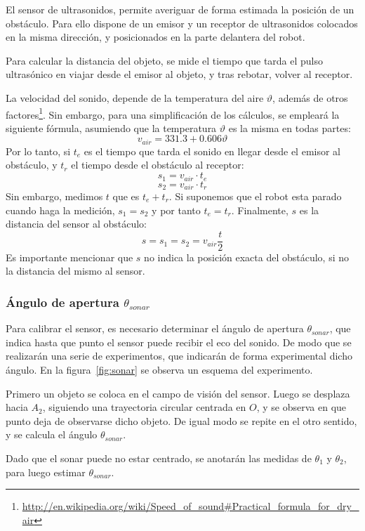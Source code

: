 \documentclass[10pt,a4paper,hidelinks]{article}
\begin{document}
\begin{multicols}{2}
El sensor de ultrasonidos, permite averiguar de forma estimada la posición de un obstáculo. Para ello dispone de un emisor y un receptor de ultrasonidos colocados en la misma dirección, y posicionados en la parte delantera del robot.

Para calcular la distancia del objeto, se mide el tiempo que tarda el pulso ultrasónico en viajar desde el emisor al objeto, y tras rebotar, volver al receptor.

La velocidad del sonido, depende de la temperatura del aire $\vartheta$, además
de otros
factores\footnote{\url{http://en.wikipedia.org/wiki/Speed\_of\_sound\#Practical\_formula\_for\_dry\_air}}.
Sin embargo, para una simplificación de los cálculos, se empleará la siguiente
fórmula, asumiendo que la temperatura $\vartheta$ es la misma en todas partes:
$$ v_{air} = 331.3 + 0.606\vartheta $$
Por lo tanto, si $t_e$ es el tiempo que tarda el sonido en llegar desde el emisor al obstáculo, y $t_r$ el tiempo desde el obstáculo al receptor:
$$ s_1 = v_{air} \cdot t_e $$
$$ s_2 = v_{air} \cdot t_r $$
Sin embargo, medimos $t$ que es $t_e+t_r$. Si suponemos que el robot esta parado cuando haga la medición, $s_1 = s_2$ y por tanto $t_e = t_r$. Finalmente, $s$ es la distancia del sensor al obstáculo:
$$ s = s_1 = s_2 = v_{air}\frac{t}{2} $$
Es importante mencionar que $s$ no indica la posición exacta del obstáculo, si 
no la distancia del mismo al sensor.

\subsubsection{Ángulo de apertura $\theta_{sonar}$}
Para calibrar el sensor, es necesario determinar el ángulo de apertura 
$\theta_{sonar}$, que indica hasta que punto el sensor puede recibir el eco del 
sonido. De modo que se realizarán una serie de experimentos, que indicarán de 
forma experimental dicho ángulo. En la figura~\ref{fig:sonar} se observa un
esquema del experimento.

Primero un objeto se coloca en el campo de visión del sensor. Luego se desplaza
hacia $A_2$, siguiendo una trayectoria circular centrada en $O$, y se observa en
que punto deja de observarse dicho objeto. De igual modo se repite en el otro
sentido, y se calcula el ángulo $\theta_{sonar}$.

Dado que el sonar puede no estar centrado, se anotarán las medidas de $\theta_1$
y $\theta_2$, para luego estimar $\theta_{sonar}$.

\begin{center}
\begin{tikzpicture}[>=latex]


\end{tikzpicture}
\end{center}
\end{multicols}
\end{document}
